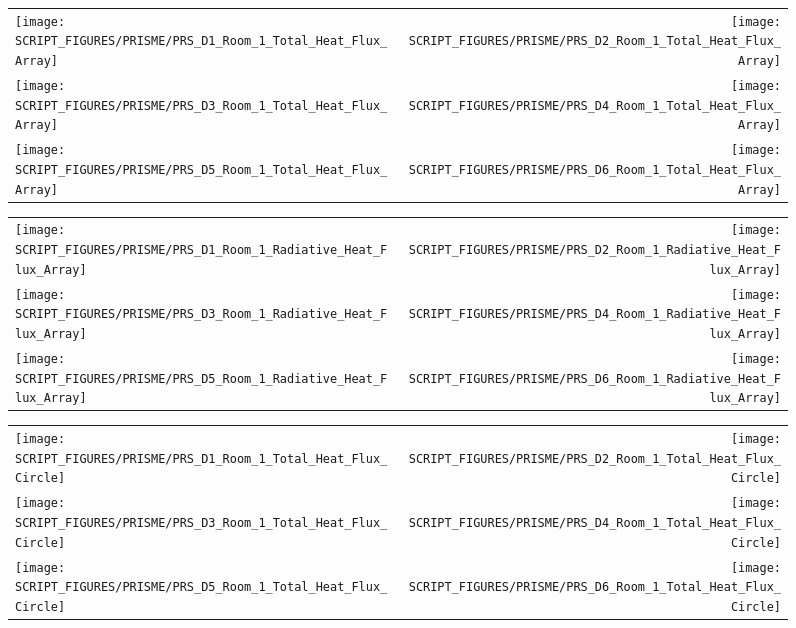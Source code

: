 \clearpage

\begin{figure}[!ht]
\begin{tabular*}{\textwidth}{l@{\extracolsep{\fill}}r}
\texttt{[image: SCRIPT\_FIGURES/PRISME/PRS\_D1\_Room\_1\_Total\_Heat\_Flux\_Array]} &
\texttt{[image: SCRIPT\_FIGURES/PRISME/PRS\_D2\_Room\_1\_Total\_Heat\_Flux\_Array]} \\
\texttt{[image: SCRIPT\_FIGURES/PRISME/PRS\_D3\_Room\_1\_Total\_Heat\_Flux\_Array]} &
\texttt{[image: SCRIPT\_FIGURES/PRISME/PRS\_D4\_Room\_1\_Total\_Heat\_Flux\_Array]} \\
\texttt{[image: SCRIPT\_FIGURES/PRISME/PRS\_D5\_Room\_1\_Total\_Heat\_Flux\_Array]} &
\texttt{[image: SCRIPT\_FIGURES/PRISME/PRS\_D6\_Room\_1\_Total\_Heat\_Flux\_Array]}
\end{tabular*}
\label{PRISME_Wall_Array_THF_Room_1}
\end{figure}

\begin{figure}[p]
\begin{tabular*}{\textwidth}{l@{\extracolsep{\fill}}r}
\texttt{[image: SCRIPT\_FIGURES/PRISME/PRS\_D1\_Room\_1\_Radiative\_Heat\_Flux\_Array]} &
\texttt{[image: SCRIPT\_FIGURES/PRISME/PRS\_D2\_Room\_1\_Radiative\_Heat\_Flux\_Array]} \\
\texttt{[image: SCRIPT\_FIGURES/PRISME/PRS\_D3\_Room\_1\_Radiative\_Heat\_Flux\_Array]} &
\texttt{[image: SCRIPT\_FIGURES/PRISME/PRS\_D4\_Room\_1\_Radiative\_Heat\_Flux\_Array]} \\
\texttt{[image: SCRIPT\_FIGURES/PRISME/PRS\_D5\_Room\_1\_Radiative\_Heat\_Flux\_Array]} &
\texttt{[image: SCRIPT\_FIGURES/PRISME/PRS\_D6\_Room\_1\_Radiative\_Heat\_Flux\_Array]}
\end{tabular*}
\label{PRISME_Wall_Array_RHF_Room_1}
\end{figure}

\begin{figure}[p]
\begin{tabular*}{\textwidth}{l@{\extracolsep{\fill}}r}
\texttt{[image: SCRIPT\_FIGURES/PRISME/PRS\_D1\_Room\_1\_Total\_Heat\_Flux\_Circle]} &
\texttt{[image: SCRIPT\_FIGURES/PRISME/PRS\_D2\_Room\_1\_Total\_Heat\_Flux\_Circle]} \\
\texttt{[image: SCRIPT\_FIGURES/PRISME/PRS\_D3\_Room\_1\_Total\_Heat\_Flux\_Circle]} &
\texttt{[image: SCRIPT\_FIGURES/PRISME/PRS\_D4\_Room\_1\_Total\_Heat\_Flux\_Circle]} \\
\texttt{[image: SCRIPT\_FIGURES/PRISME/PRS\_D5\_Room\_1\_Total\_Heat\_Flux\_Circle]} &
\texttt{[image: SCRIPT\_FIGURES/PRISME/PRS\_D6\_Room\_1\_Total\_Heat\_Flux\_Circle]}
\end{tabular*}
\label{PRISME_Wall_Circle_THF_Room_1}
\end{figure}

